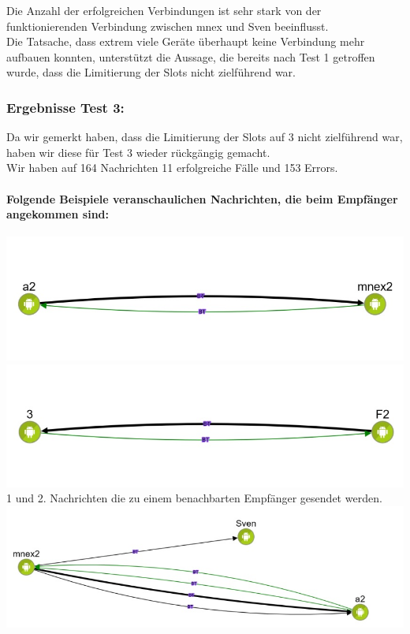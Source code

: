 Die Anzahl der erfolgreichen Verbindungen ist sehr stark von der
funktionierenden Verbindung zwischen mnex und Sven beeinflusst.\\

Die Tatsache, dass extrem viele Geräte überhaupt keine Verbindung mehr
aufbauen konnten, unterstützt die Aussage, die bereits nach Test 1
getroffen wurde, dass die Limitierung der Slots nicht zielführend war.

\subsubsection{Ergebnisse Test 3:}\label{ergebnisse-test-3}

Da wir gemerkt haben, dass die Limitierung der Slots auf 3 nicht
zielführend war, haben wir diese für Test 3 wieder rückgängig gemacht.\\

Wir haben auf 164 Nachrichten 11 erfolgreiche Fälle und 153 Errors.

\paragraph*{Folgende Beispiele veranschaulichen Nachrichten, die beim
Empfänger angekommen sind:}
\includegraphics[width=1.0\textwidth]{belege/grosstests/Bilder/Grosstest2/Test3Erfolg1.jpg}\\
\includegraphics[width=1.0\textwidth]{belege/grosstests/Bilder/Grosstest2/Test3Erfolg2.jpg}\\
1 und 2. Nachrichten die zu einem benachbarten Empfänger gesendet werden.\\
\includegraphics[width=1.0\textwidth]{belege/grosstests/Bilder/Grosstest2/Test3Erfolg3.jpg}\\

